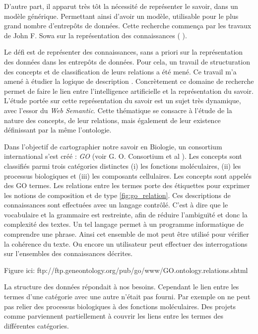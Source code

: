 \begin{refsegment}
D'autre part, il apparut très tôt la nécessité de représenter le savoir, dans un modèle générique. Permettant ainsi d'avoir un modèle, utilisable pour le plus grand nombre d'entrepôts de données. Cette recherche commença par les travaux de John F. Sowa sur la représentation des connaissances ( \citeyear{sowa92,sowa99}).

Le défi est de représenter des connaissances, sans a priori sur la représentation des données dans les entrepôts de données. Pour cela, un travail de structuration des concepts et de classification de leurs relations a été mené. Ce travail m'a amené à étudier la logique de description \cite{baader2003description}. Concrètement ce domaine de recherche permet de faire le lien entre l'intelligence artificielle et la représentation du savoir. L'étude portée sur cette représentation du savoir est un sujet très dynamique, avec l'essor du \textit{Web Semantic}. Cette thématique se consacre à l'étude de la nature des concepts, de leur relations, mais également de leur existence définissant par la même l'ontologie.

Dans l'objectif de cartographier notre savoir en Biologie, un consortium international s'est créé : \textit{\gls{GO}} (voir G. O. Consortium
et al \citeyear{go2001,go2004}). Les concepts sont classifiés parmi trois catégories distinctes (i) les fonctions moléculaires, (ii) les processus biologiques et (iii) les composants cellulaires. Les concepts sont appelés des GO termes. Les relations entre les termes porte des étiquettes pour exprimer les notions de composition et de type \ref{fig:go_relation}. Ces descriptions de connaissances sont effectuées avec un langage contrôlé.  C’est à dire que le vocabulaire et la grammaire est restreinte, afin de réduire l'ambiguïté et donc la complexité des textes. Un tel langage permet à un programme informatique de comprendre une phrase. Ainsi cet ensemble de mot peut être utilisé pour vérifier la cohérence du texte. Ou encore un utilisateur peut effectuer des interrogations sur l’ensembles des connaissances décrites.

Figure ici: ftp://ftp.geneontology.org/pub/go/www/GO.ontology.relations.shtml


La structure des données répondait à nos besoins. Cependant le lien entre les termes d'une catégorie avec une autre n'était pas fourni. Par exemple on ne peut pas relier des processus biologiques à des fonctions moléculaires. Des projets comme \cite{AdditionalGO2006} parviennent partiellement à couvrir les liens  entre les termes des différentes catégories.


\end{refsegment}
